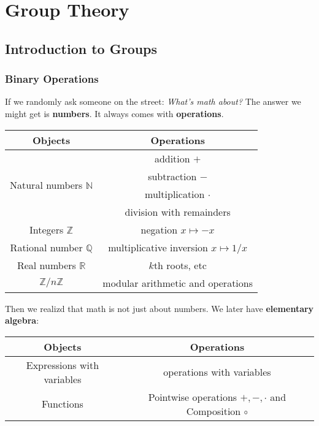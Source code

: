 \part{Group Theory}

\chapter{Introduction to Groups}
\section{Binary Operations}

If we randomly ask someone on the street: \textit{What's math about?} The answer we might get is \textbf{numbers}. It always comes with \textbf{operations}.

\begin{center}
	\begin{tabular}{c | c}
		Objects & Operations\\\hline\hline 
		\multirow{4}{*}{Natural numbers $\mathbb N$} & addition $+$
		\\ & subtraction $-$\\ & multiplication $\cdot$ \\ & division with remainders\\\hline 
		Integers $\mathbb Z$ & negation $x\mapsto -x$ \\\hline
		Rational number $\mathbb{Q}$ & multiplicative inversion $x\mapsto 1/x$\\\hline 
		Real numbers $\mathbb R$ & $k$th roots, etc\\\hline
		$\mathbb Z/n\mathbb Z$ & modular arithmetic and operations 
	\end{tabular}
\end{center}

Then we realizd that math is not just about numbers. We later have \textbf{elementary algebra}:

\begin{center}
\begin{tabular}{c | c}
Objects & Operations \\\hline\hline 
Expressions with variables & operations with variables \\\hline 
Functions & Pointwise operations $+,-,\cdot$ and Composition $\circ$
\end{tabular}
\end{center}

